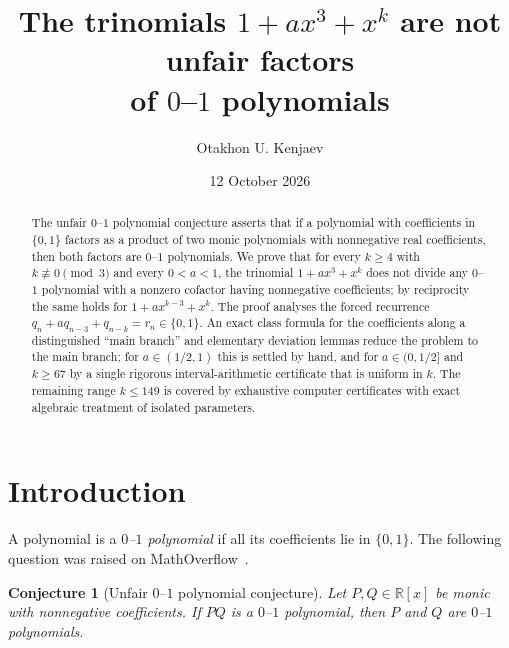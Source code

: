 \documentclass[11pt]{amsart}
\title[The trinomials $1+ax^3+x^k$]{The trinomials $1+ax^3+x^k$ are not unfair factors\\ of $0$--$1$ polynomials}
\author{Otakhon U. Kenjaev}
\date{12 October 2026}
\newtheorem{conjecture}[theorem]{Conjecture}
\theoremstyle{definition}
\theoremstyle{remark}
\begin{document}
\begin{abstract}
The unfair $0$--$1$ polynomial conjecture asserts that if a polynomial with
coefficients in $\{0,1\}$ factors as a product of two monic polynomials with
nonnegative real coefficients, then both factors are $0$--$1$ polynomials.
We prove that for every $k\ge 4$ with $k\not\equiv 0 \pmod 3$ and every
$0<a<1$, the trinomial $1+ax^3+x^k$ does not divide any $0$--$1$ polynomial with a
nonzero cofactor having nonnegative coefficients; by reciprocity the same holds
for $1+ax^{k-3}+x^k$. The proof analyses the forced recurrence
$q_n+aq_{n-3}+q_{n-k}=r_n\in\{0,1\}$. An exact class formula for the
coefficients along a distinguished ``main branch'' and elementary deviation
lemmas reduce the problem to the main branch; for $a\in(1/2,1)$ this is settled
by hand, and for $a\in(0,1/2]$ and $k\ge 67$ by a single rigorous
interval-arithmetic certificate that is uniform in $k$. The remaining range
$k\le 149$ is covered by exhaustive computer certificates with exact algebraic
treatment of isolated parameters.
\end{abstract}

\maketitle

\section{Introduction}

A polynomial is a \emph{$0$--$1$ polynomial} if all its coefficients lie in
$\{0,1\}$. The following question was raised on MathOverflow~\cite{MO339137}.

\begin{conjecture}[Unfair $0$--$1$ polynomial conjecture]
Let $P,Q\in\mathbb{R}[x]$ be monic with nonnegative coefficients. If $PQ$ is a
$0$--$1$ polynomial, then $P$ and $Q$ are $0$--$1$ polynomials.
\end{conjecture}
\end{document}
